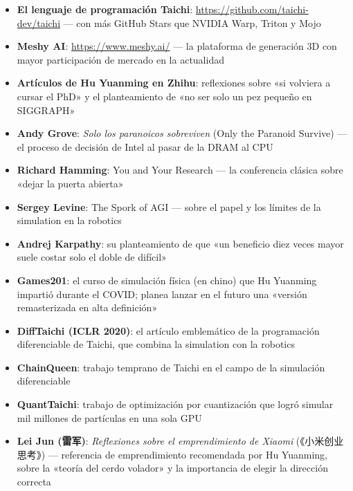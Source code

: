 \begin{itemize}
\item \textbf{El lenguaje de programación Taichi}: \url{https://github.com/taichi-dev/taichi} — con más GitHub Stars que NVIDIA Warp, Triton y Mojo
\item \textbf{Meshy AI}: \url{https://www.meshy.ai/} — la plataforma de generación 3D con mayor participación de mercado en la actualidad
\item \textbf{Artículos de Hu Yuanming en Zhihu}: reflexiones sobre «si volviera a cursar el PhD» y el planteamiento de «no ser solo un pez pequeño en SIGGRAPH»
\item \textbf{Andy Grove}: \textit{Solo los paranoicos sobreviven} (Only the Paranoid Survive) — el proceso de decisión de Intel al pasar de la DRAM al CPU
\item \textbf{Richard Hamming}: You and Your Research — la conferencia clásica sobre «dejar la puerta abierta»
\item \textbf{Sergey Levine}: The Spork of AGI — sobre el papel y los límites de la simulation en la robotics
\item \textbf{Andrej Karpathy}: su planteamiento de que «un beneficio diez veces mayor suele costar solo el doble de difícil»
\item \textbf{Games201}: el curso de simulación física (en chino) que Hu Yuanming impartió durante el COVID; planea lanzar en el futuro una «versión remasterizada en alta definición»
\item \textbf{DiffTaichi (ICLR 2020)}: el artículo emblemático de la programación diferenciable de Taichi, que combina la simulation con la robotics
\item \textbf{ChainQueen}: trabajo temprano de Taichi en el campo de la simulación diferenciable
\item \textbf{QuantTaichi}: trabajo de optimización por cuantización que logró simular mil millones de partículas en una sola GPU
\item \textbf{Lei Jun (雷军)}: \textit{Reflexiones sobre el emprendimiento de Xiaomi} (《小米创业思考》) — referencia de emprendimiento recomendada por Hu Yuanming, sobre la «teoría del cerdo volador» y la importancia de elegir la dirección correcta
\end{itemize}



